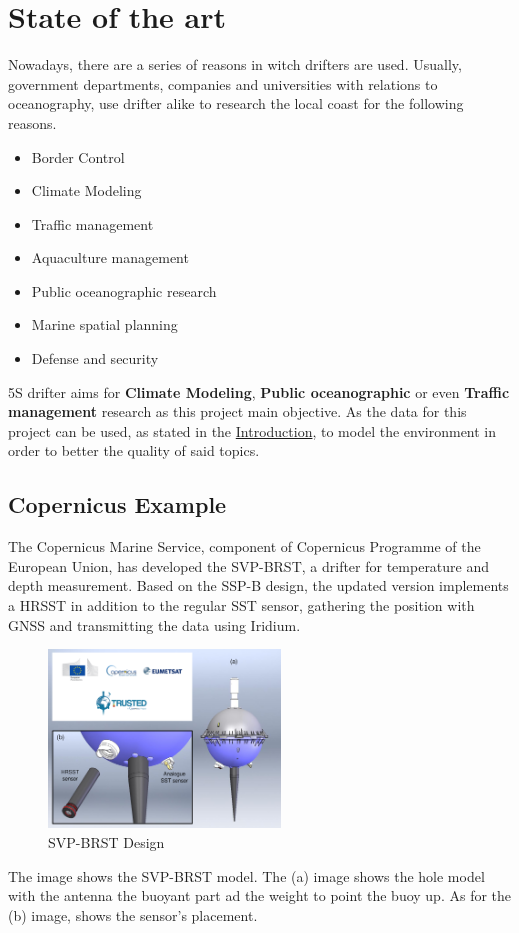 \section{State of the art}
Nowadays, there are a series of reasons in witch drifters are used. Usually, government 
departments, companies and universities with relations to oceanography, use drifter alike 
to research the local coast for the following reasons.

\begin{itemize}
    \item Border Control
    \item Climate Modeling
    \item Traffic management
    \item Aquaculture management
    \item Public oceanographic research
    \item Marine spatial planning
    \item Defense and security
\end{itemize}

5S drifter aims for \textbf{Climate Modeling}, \textbf{Public oceanographic} or even \textbf{Traffic management} research as this project main objective.
As the data for this project can be used, as stated in the \hyperref[sec:Problem Statement]{Introduction}, to model the environment
in order to better the quality of said topics.
\subsection{Copernicus Example}

The Copernicus Marine Service, component of Copernicus Programme of the 
European Union, has developed the SVP-BRST, a drifter for temperature and depth measurement.
Based on the SSP-B design, the updated version implements a HRSST in addition to the regular 
SST sensor, gathering the position with GNSS and transmitting the data using Iridium.
\begin{figure}[H]
    \centering
    \includegraphics[width=0.55\textwidth]{images/chapter/analysis/svp.png}  %
    \caption{SVP-BRST Design}
    \label{fig:SVP-BRST Design}        
\end{figure}
The image shows the SVP-BRST model. The (a) image shows the hole model with the antenna the buoyant part ad the weight to point the buoy up.
As for the (b) image, shows the sensor's placement. 

